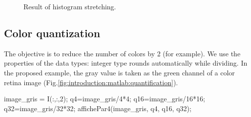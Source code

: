 \begin{figure}[htbp]
 \centering
 \vspace{.5cm}
 \vspace{.5cm}
 \caption{Result of histogram stretching.}
 \label{fig:introduction:matlab:histo_stretched}
\end{figure}


\subsection{Color quantization}


The objective is to reduce the number of colors by 2 (for example). We use the 
properties of the data types: integer type rounds automatically while dividing.
In the proposed example, the gray value is taken as the green channel of a color retina image (Fig.\ref{fig:introduction:matlab:quantification}).

\begin{matlab}
image_gris = I(:,:,2); %
q4=image_gris/4*4;
q16=image_gris/16*16;
q32=image_gris/32*32;
affichePar4(image_gris, q4, q16, q32);
\end{matlab}

